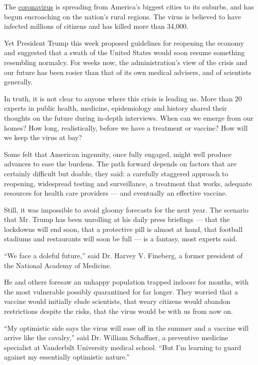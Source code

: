 The
\href{https://www.nytimes3xbfgragh.onion/2020/06/01/nyregion/nyc-coronavirus-flatbush-brooklyn.html}{coronavirus}
is spreading from America's biggest cities to its suburbs, and has begun
encroaching on the nation's rural regions. The virus is believed to have
infected millions of citizens and has killed more than 34,000.

Yet President Trump this week proposed guidelines for reopening the
economy and suggested that a swath of the United States would soon
resume something resembling normalcy. For weeks now, the
administration's view of the crisis and our future has been rosier than
that of its own medical advisers, and of scientists generally.

In truth, it is not clear to anyone where this crisis is leading us.
More than 20 experts in public health, medicine, epidemiology and
history shared their thoughts on the future during in-depth interviews.
When can we emerge from our homes? How long, realistically, before we
have a treatment or vaccine? How will we keep the virus at bay?

Some felt that American ingenuity, once fully engaged, might well
produce advances to ease the burdens. The path forward depends on
factors that are certainly difficult but doable, they said: a carefully
staggered approach to reopening, widespread testing and surveillance, a
treatment that works, adequate resources for health care providers ---
and eventually an effective vaccine.

Still, it was impossible to avoid gloomy forecasts for the next year.
The scenario that Mr. Trump has been unrolling at his daily press
briefings --- that the lockdowns will end soon, that a protective pill
is almost at hand, that football stadiums and restaurants will soon be
full --- is a fantasy, most experts said.

``We face a doleful future,'' said Dr. Harvey V. Fineberg, a former
president of the National Academy of Medicine.

He and others foresaw an unhappy population trapped indoors for months,
with the most vulnerable possibly quarantined for far longer. They
worried that a vaccine would initially elude scientists, that weary
citizens would abandon restrictions despite the risks, that the virus
would be with us from now on.

``My optimistic side says the virus will ease off in the summer and a
vaccine will arrive like the cavalry,'' said Dr. William Schaffner, a
preventive medicine specialist at Vanderbilt University medical school.
``But I'm learning to guard against my essentially optimistic nature.''

